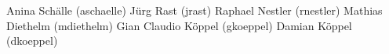 Anina Schälle (aschaelle)
Jürg Rast (jrast)
Raphael Nestler (rnestler)
Mathias Diethelm (mdiethelm)
Gian Claudio Köppel (gkoeppel)
Damian Köppel (dkoeppel)
